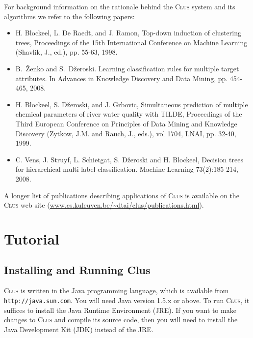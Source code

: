 \documentclass[a4paper]{report}
\newcommand{\clus}{\textsc{Clus}}
\begin{document}
For background information on the rationale behind the \clus{} system and its algorithms we refer to the following papers:

\begin{itemize}

\item H. Blockeel, L. De Raedt, and J. Ramon, Top-down induction of clustering trees, Proceedings of the 15th International Conference on Machine Learning (Shavlik, J., ed.), pp. 55-63, 1998.

\item B.~{\v{Z}}enko and S.~D{\v{z}}eroski. Learning classification rules for multiple target attributes. In Advances in Knowledge Discovery and Data Mining, pp. 454-465, 2008.

\item H. Blockeel, S. D\v zeroski, and J. Grbovic, Simultaneous prediction of multiple chemical parameters of river water quality with TILDE, Proceedings of the Third European Conference on Principles of Data Mining and Knowledge Discovery (Zytkow, J.M. and Rauch, J., eds.), vol 1704, LNAI, pp. 32-40, 1999.

\item  C. Vens, J. Struyf, L. Schietgat, S. D\v zeroski and H. Blockeel, Decision trees for hierarchical multi-label classification. Machine Learning 73(2):185-214, 2008.
\end{itemize}

A longer list of publications describing applications of \clus{} is available on the \clus{} web site
(\url{www.cs.kuleuven.be/~dtai/clus/publications.html}).

\chapter{Tutorial}

\section{Installing and Running Clus}
\label{sec:run}

\begin{sloppypar}
\clus{} is written in the Java programming language, which is available from {\tt http://java.sun.com}. You will need Java version 1.5.x or above. To run \clus{}, it suffices to install the Java Runtime Environment (JRE). If you want to make changes to \clus{} and compile its source code, then you will need to install the Java Development Kit (JDK) instead of the JRE.
\end{sloppypar}
\end{document}
